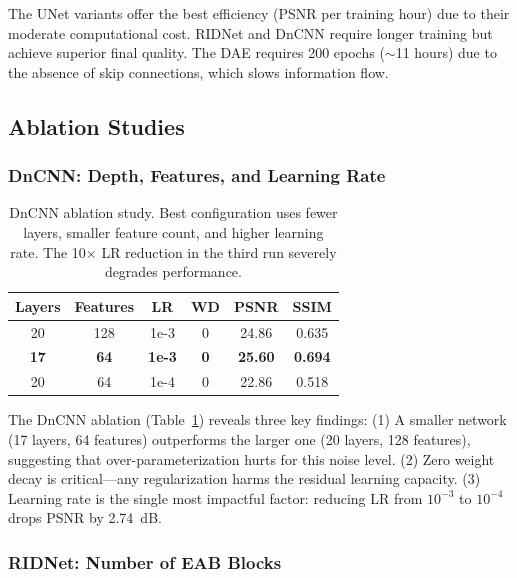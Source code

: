 The UNet variants offer the best efficiency (PSNR per training hour) due to their moderate computational cost. RIDNet and DnCNN require longer training but achieve superior final quality. The DAE requires 200 epochs ($\sim$11 hours) due to the absence of skip connections, which slows information flow.

\subsection{Ablation Studies}

\subsubsection{DnCNN: Depth, Features, and Learning Rate}

\begin{table}[t]
\centering
\small
\setlength{\tabcolsep}{3pt}
\begin{tabular}{cccccc}
\toprule
\textbf{Layers} & \textbf{Features} & \textbf{LR} & \textbf{WD} & \textbf{PSNR} & \textbf{SSIM} \\
\midrule
20 & 128 & 1e-3 & 0 & 24.86 & 0.635 \\
\textbf{17} & \textbf{64} & \textbf{1e-3} & \textbf{0} & \textbf{25.60} & \textbf{0.694} \\
20 & 64 & 1e-4 & 0 & 22.86 & 0.518 \\
\bottomrule
\end{tabular}
\caption{DnCNN ablation study. Best configuration uses fewer layers, smaller feature count, and higher learning rate. The 10$\times$ LR reduction in the third run severely degrades performance.}
\label{tab:dncnn_ablation}
\end{table}

The DnCNN ablation (Table~\ref{tab:dncnn_ablation}) reveals three key findings: (1) A smaller network (17 layers, 64 features) outperforms the larger one (20 layers, 128 features), suggesting that over-parameterization hurts for this noise level. (2) Zero weight decay is critical---any regularization harms the residual learning capacity. (3) Learning rate is the single most impactful factor: reducing LR from $10^{-3}$ to $10^{-4}$ drops PSNR by 2.74~dB.

\subsubsection{RIDNet: Number of EAB Blocks}

